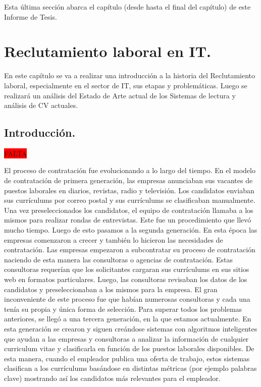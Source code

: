 \documentclass[12pt,a4paper]{article}
\begin{document}
Esta última sección abarca el capítulo \textit{} (desde \textit{} hasta el final del capítulo) de este Informe de Tesis.

\cleardoublepage    %

\section{Reclutamiento laboral en IT.}\label{2.ReclutamientolaboralenIT}

En este capítulo se va a realizar una introducción a la historia del Reclutamiento laboral, especialmente en el sector de IT, sus etapas y problemáticas.
Luego se realizará un análisis del Estado de Arte actual de los Sistemas de lectura y análisis de CV actuales.

\subsection{Introducción.}
\colorbox{red}{FALTA}

El proceso de contratación fue evolucionando a lo largo del tiempo. En el modelo de contratación de primera generación, las empresas anunciaban sus vacantes de puestos laborales en diarios, revistas, radio y televisión. Los candidatos enviaban sus currículums por correo postal y sus currículums se clasificaban manualmente. Una vez preseleccionados los candidatos, el equipo de contratación llamaba a los mismos para realizar rondas de entrevistas. Este fue un procedimiento que llevó mucho tiempo.
Luego de esto pasamos a la segunda generación. En esta época las empresas comenzaron a crecer y también lo hicieron las necesidades de contratación. Las empresas empezaron a subcontratar su proceso de contratación naciendo de esta manera las consultoras o agencias de contratación. Estas consultoras requerían que los solicitantes cargaran sus currículums en sus sitios web en formatos particulares. Luego, las consultoras revisaban los datos de los candidatos y preseleccionaban a los mismos para la empresa. El gran inconveniente de este proceso fue que habían numerosas consultoras y cada una tenía su propia y única forma de selección.
Para superar todos los problemas anteriores, se llegó a una tercera generación, en la que estamos actualmente. En esta generación se crearon y siguen creándose sistemas con algoritmos inteligentes que ayudan a las empresas y consultoras a analizar la información de cualquier curriculum vitae y clasificarla en función de los puestos laborales disponibles. De esta manera, cuando el empleador publica una oferta de trabajo, estos sistemas clasifican a los currículums basándose en distintas métricas (por ejemplo palabras clave) mostrando así los candidatos más relevantes para el empleador.
\end{document}
